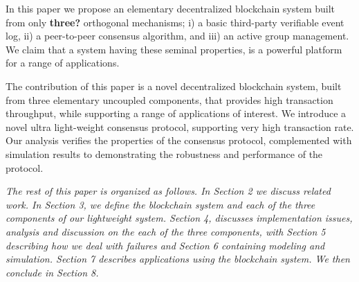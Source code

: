\documentclass[10pt]{article}
\begin{document}
In this paper we propose an elementary decentralized blockchain system built from only \textbf{three?} orthogonal mechanisms; i) a basic third-party verifiable event log, ii) a peer-to-peer consensus algorithm, and iii) %
an active group management. 
We claim that a system having these seminal properties, is a powerful platform for a range of applications.

The contribution of this paper is a novel decentralized blockchain system, built from three elementary uncoupled components, that provides high transaction throughput, while supporting a range of applications of interest. We introduce a novel ultra light-weight consensus protocol, supporting very high transaction rate. Our analysis verifies the properties of the consensus protocol, complemented with simulation results to demonstrating the robustness and performance of the protocol. 

\emph{The rest of this paper is organized as follows. In Section 2 we discuss related work. In Section 3, we define the blockchain system and each of the three components of our lightweight system. Section 4, discusses implementation issues, analysis and discussion on the each of the three components, with Section 5 describing how we deal with failures and Section 6 containing modeling and simulation. Section 7 describes applications using the blockchain system. We then conclude in Section 8. } 







\end{document}
